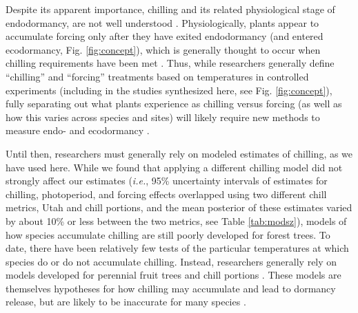 \documentclass{article}
\begin{document}
\par Despite its apparent importance, chilling and its related physiological stage of endodormancy, are not well understood \emph{\citep{chuine2016}}. Physiologically, plants appear to accumulate forcing only after they have exited endodormancy (and entered ecodormancy, Fig. \ref{fig:concept}), which is generally thought to occur when chilling requirements have been met \emph{\citep{chuine2016}}. Thus, while researchers generally define ``chilling'' and ``forcing'' treatments based on temperatures in controlled experiments (including in the studies synthesized here, see Fig. \ref{fig:concept}), fully separating out what plants experience as chilling versus forcing (as well as how this varies across species and sites) will likely require new methods to measure endo- and ecodormancy \emph{\citep{vanderschoot2014}}. 

\par Until then, researchers must generally rely on modeled estimates of chilling, as we have used here. While we found that applying a different chilling model did not strongly affect our estimates (\emph{i.e.}, 95\% uncertainty intervals of estimates for chilling, photoperiod, and forcing effects overlapped using two different chill metrics, Utah and chill portions, and the mean posterior of these estimates varied by about 10\% or less between the two metrics, see Table \ref{tab:modsz}), models of how species accumulate chilling are still poorly developed for forest trees. To date, there have been relatively few tests of the particular temperatures at which species do or do not accumulate chilling. Instead, researchers generally rely on models developed for perennial fruit trees \emph{\citep[i.e., ][]{richardson1974}} and chill portions \emph{\citep{fishman1987}}. These models are themselves hypotheses for how chilling may accumulate and lead to dormancy release, but are likely to be inaccurate for many species \emph{\citep{dennis2003}}. 
\end{document}
